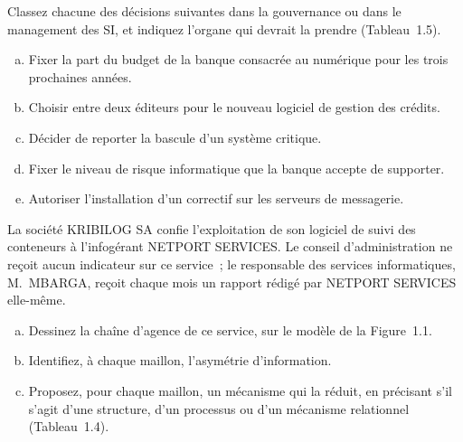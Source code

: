 \begin{boxexo}[title={\ding{45}\quad Exercice~1.1. Gouvernance ou management~? \niveaubase}]
Classez chacune des décisions suivantes dans la gouvernance ou dans le
management des SI, et indiquez l'organe qui devrait la prendre
(Tableau~1.5).
\begin{enumerate}[(a)]
    \item Fixer la part du budget de la banque consacrée au numérique pour
          les trois prochaines années.
    \item Choisir entre deux éditeurs pour le nouveau logiciel de gestion
          des crédits.
    \item Décider de reporter la bascule d'un système critique.
    \item Fixer le niveau de risque informatique que la banque accepte de
          supporter.
    \item Autoriser l'installation d'un correctif sur les serveurs de
          messagerie.
\end{enumerate}
\end{boxexo}

\begin{boxexo}[title={\ding{45}\quad Exercice~1.2. La chaîne d'agence de KRIBILOG \niveaumoyen}]
La société KRIBILOG SA confie l'exploitation de son logiciel de suivi des
conteneurs à l'infogérant NETPORT SERVICES. Le conseil d'administration ne
reçoit aucun indicateur sur ce service~; le responsable des services
informatiques, M.~MBARGA, reçoit chaque mois un rapport rédigé par
NETPORT SERVICES elle-même.
\begin{enumerate}[(a)]
    \item Dessinez la chaîne d'agence de ce service, sur le modèle de la
          Figure~1.1.
    \item Identifiez, à chaque maillon, l'asymétrie d'information.
    \item Proposez, pour chaque maillon, un mécanisme qui la réduit, en
          précisant s'il s'agit d'une structure, d'un processus ou d'un
          mécanisme relationnel (Tableau~1.4).
\end{enumerate}
\end{boxexo}

